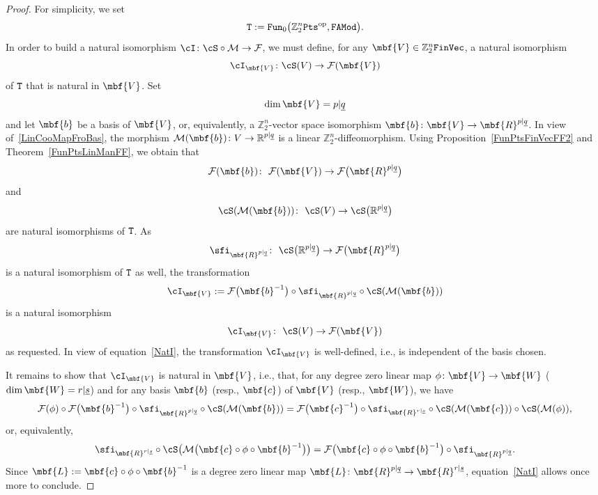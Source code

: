 \documentclass[10pt,a4paper]{amsart}
\newcommand{\op}[1]{\operatorname{#1}}
\newcommand{\R}{{\mathbb R}}
\newcommand{\Z}{{\mathbb Z}}
\def\ul{\underline}
\def\cM{\cal M}
\def\cF{\mathcal{F}}
\def\cM{\mathcal{M}}
\def\ul{\underline}
\newcommand{\0}{\otimes}
\newcommand{\z}{\Z_2^n}
\numberwithin{equation}{section}
\providecommand{\cal}{\mathcal}
\begin{document}
\begin{proof}
For simplicity, we set
\[
{\tt T}:={\tt Fun}_0\big(\z{\tt Pts}^{\op{op}},{\tt FAMod}\big).
\]
In order to build a natural isomorphism $\cI\colon \cS\circ\cM\to\cF$, we must define, for any $\mbf{V}\in\z{\tt FinVec}$, a natural isomorphism
\[
\cI_{\mbf{V}}\colon \cS(V)\to \cF(\mbf{V})
\]
of ${\tt T}$ that is natural in $\mbf{V}$.
Set
\[
\dim\mbf{V}=p|\ul q
\]
and let $\mbf{b}$ be a basis of $\mbf{V}$, or, equivalently, a $\z$-vector space isomorphism $\mbf{b}\colon \mbf{V}\to\mbf{R}^{p|\ul q}$. In view of~\eqref{LinCooMapFroBas}, the morphism $\cM(\mbf{b})\colon V\to \R^{p|\ul q}$ is a linear $\z$-diffeomorphism. Using Proposition~\ref{FunPtsFinVecFF2} and Theorem~\ref{FunPtsLinManFF}, we obtain that
\[
\cF(\mbf{b})\colon\ \cF(\mbf{V})\to\cF\big(\mbf{R}^{p|\ul q}\big)
\]
and
\[
\cS(\cM(\mbf{b}))\colon\ \cS(V)\to\cS\big(\R^{p|\ul q}\big)
\]
are natural isomorphisms of ${\tt T}$. As
\[
\sfi_{\mbf{R}^{p|\ul q}}\colon\ \cS\big(\R^{p|\ul q}\big)\to\cF\big(\mbf{R}^{p|\ul q}\big)
\]
is a natural isomorphism of ${\tt T}$ as well, the transformation
\[
\cI_{\mbf{V}}:=\cF\big(\mbf{b}^{-1}\big)\circ\sfi_{\mbf{R}^{p|\ul q}}\circ\cS(\cM(\mbf{b}))
\]
is a natural isomorphism
\[
\cI_{\mbf{V}}\colon\ \cS(V)\to\cF(\mbf{V})
\]
as requested. In view of equation~\eqref{NatI}, the transformation $\cI_{\mbf{V}}$ is well-defined, i.e., is independent of the basis chosen.

It remains to show that $\cI_\mbf{V}$ is natural in $\mbf{V}$, i.e., that, for any degree zero linear map $\phi\colon \mbf{V}\to\mbf{W}$ ($\dim\mbf{W}=r|\ul s$) and for any basis $\mbf{b}$ (resp., $\mbf{c}$) of $\mbf{V}$ (resp., $\mbf{W}$), we have
\[
\cF(\phi)\circ\cF\big(\mbf{b}^{-1}\big)\circ\sfi_{\mbf{R}^{p|\ul q}}\circ\cS(\cM(\mbf{b}))=\cF\big(\mbf{c}^{-1}\big)\circ\sfi_{\mbf{R}^{r|\ul s}}\circ\cS(\cM(\mbf{c}))\circ\cS(\cM(\phi)),
\]
or, equivalently,
\[
\sfi_{\mbf{R}^{r|\ul s}}\circ\cS\big(\cM\big(\mbf{c}\circ\phi\circ\mbf{b}^{-1}\big)\big) =\cF\big(\mbf{c}\circ\phi\circ\mbf{b}^{-1}\big)\circ \sfi_{\mbf{R}^{p|\ul q}}.
\]
Since $\mbf{L}:=\mbf{c}\circ\phi\circ\mbf{b}^{-1}$ is a degree zero linear map $\mbf{L}\colon \mbf{R}^{p|\ul q}\to\mbf{R}^{r|\ul s}$, equation~\eqref{NatI} allows once more to conclude.
\end{proof}

\newcommand{\ccD}{\mathcal{D}}
\end{document}
